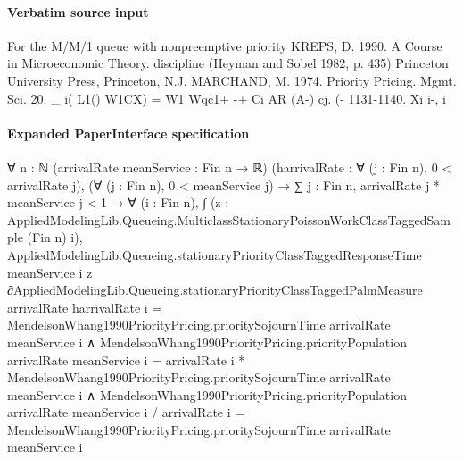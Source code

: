 \documentclass[10pt]{article}
\begin{document}
\paragraph{Verbatim source input}
\begin{ReviewVerbatim}
For the M/M/1 queue with nonpreemptive priority                         KREPS, D. 1990. A Course in Microeconomic Theory.
discipline (Heyman and Sobel 1982, p. 435)                                 Princeton University Press, Princeton, N.J.
                                                                        MARCHAND, M. 1974. Priority Pricing. Mgmt. Sci. 20,
   _ i( L1()
 W1CX)  = W1 Wqc1+ -+
                   Ci AR   (A-)
                      cj. (-                                                  1131-1140.
                Xi        i-,           i
\end{ReviewVerbatim}



\paragraph{Expanded PaperInterface specification}
\begin{ReviewVerbatim}
∀ {n : ℕ} (arrivalRate meanService : Fin n → ℝ) (harrivalRate : ∀ (j : Fin n), 0 < arrivalRate j),
  (∀ (j : Fin n), 0 < meanService j) →
    ∑ j : Fin n, arrivalRate j * meanService j < 1 →
      ∀ (i : Fin n),
        ∫ (z : AppliedModelingLib.Queueing.MulticlassStationaryPoissonWorkClassTaggedSample (Fin n) i),
              AppliedModelingLib.Queueing.stationaryPriorityClassTaggedResponseTime meanService i
                z ∂AppliedModelingLib.Queueing.stationaryPriorityClassTaggedPalmMeasure arrivalRate harrivalRate i =
            MendelsonWhang1990PriorityPricing.prioritySojournTime arrivalRate meanService i ∧
          MendelsonWhang1990PriorityPricing.priorityPopulation arrivalRate meanService i =
              arrivalRate i * MendelsonWhang1990PriorityPricing.prioritySojournTime arrivalRate meanService i ∧
            MendelsonWhang1990PriorityPricing.priorityPopulation arrivalRate meanService i / arrivalRate i =
              MendelsonWhang1990PriorityPricing.prioritySojournTime arrivalRate meanService i
\end{ReviewVerbatim}
\end{document}
